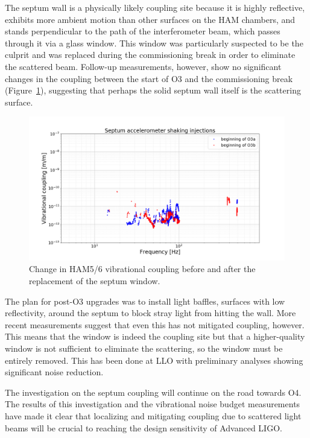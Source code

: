 The septum wall is a physically likely coupling site because it is highly reflective, exhibits more ambient motion than other surfaces on the HAM chambers, and stands perpendicular to the path of the interferometer beam, which passes through it via a glass window.
This window was particularly suspected to be the culprit and was replaced during the commissioning break in order to eliminate the scattered beam.
Follow-up measurements, however, show no significant changes in the coupling between the start of O3 and the commissioning break (Figure~\ref{fig:vib-septum-midrun}), suggesting that perhaps the solid septum wall itself is the scattering surface.

\begin{figure}[htb]
	\includegraphics[width=\textwidth]{figures/noise-studies/vib-septum-midrun.png}
	\caption{Change in HAM5/6 vibrational coupling before and after the replacement of the septum window.}
	\label{fig:vib-septum-midrun}
\end{figure}

The plan for post-O3 upgrades was to install light baffles, surfaces with low reflectivity, around the septum to block stray light from hitting the wall.
More recent measurements suggest that even this has not mitigated coupling, however.
This means that the window is indeed the coupling site but that a higher-quality window is not sufficient to eliminate the scattering, so the window must be entirely removed.
This has been done at LLO with preliminary analyses showing significant noise reduction.

The investigation on the septum coupling will continue on the road towards O4.
The results of this investigation and the vibrational noise budget measurements have made it clear that localizing and mitigating coupling due to scattered light beams will be crucial to reaching the design sensitivity of Advanced LIGO.



